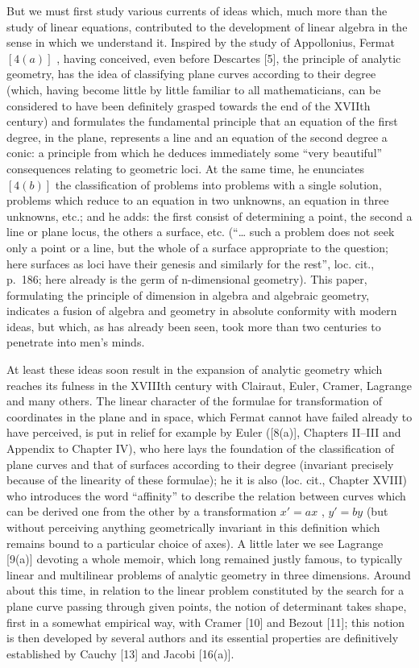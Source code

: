 But we must first study various currents of ideas which, much more than the study of linear equations, contributed to the development of linear algebra in the sense in which we understand it. Inspired by the study of Appollonius, Fermat \([4(a)]\) , having conceived, even before Descartes {[}5{]}, the principle of analytic geometry, has the idea of classifying plane curves according to their degree (which, having become little by little familiar to all mathematicians, can be considered to have been definitely grasped towards the end of the XVIIth century) and formulates the fundamental principle that an equation of the first degree, in the plane, represents a line and an equation of the second degree a conic: a principle from which he deduces immediately some ``very beautiful'' consequences relating to geometric loci. At the same time, he enunciates \([4(b)]\) the classification of problems into problems with a single solution, problems which reduce to an equation in two unknowns, an equation in three unknowns, etc.; and he adds: the first consist of determining a point, the second a line or plane locus, the others a surface, etc. (``\ldots{} such a problem does not seek only a point or a line, but the whole of a surface appropriate to the question; here surfaces as loci have their genesis and similarly for the rest'', loc. cit., p.~186; here already is the germ of n-dimensional geometry). This paper, formulating the principle of dimension in algebra and algebraic geometry, indicates a fusion of algebra and geometry in absolute conformity with modern ideas, but which, as has already been seen, took more than two centuries to penetrate into men's minds.

At least these ideas soon result in the expansion of analytic geometry which reaches its fulness in the XVIIIth century with Clairaut, Euler, Cramer, Lagrange and many others. The linear character of the formulae for transformation of coordinates in the plane and in space, which Fermat cannot have failed already to have perceived, is put in relief for example by Euler ({[}8(a){]}, Chapters II--III and Appendix to Chapter IV), who here lays the foundation of the classification of plane curves and that of surfaces according to their degree (invariant precisely because of the linearity of these formulae); he it is also (loc. cit., Chapter XVIII) who introduces the word ``affinity'' to describe the relation between curves which can be derived one from the other by a transformation \(x' = ax\) , \(y' = by\) (but without perceiving anything geometrically invariant in this definition which remains bound to a particular choice of axes). A little later we see Lagrange {[}9(a){]} devoting a whole memoir, which long remained justly famous, to typically linear and multilinear problems of analytic geometry in three dimensions. Around about this time, in relation to the linear problem constituted by the search for a plane curve passing through given points, the notion of determinant takes shape, first in a somewhat empirical way, with Cramer {[}10{]} and Bezout {[}11{]}; this notion is then developed by several authors and its essential properties are definitively established by Cauchy {[}13{]} and Jacobi {[}16(a){]}.

